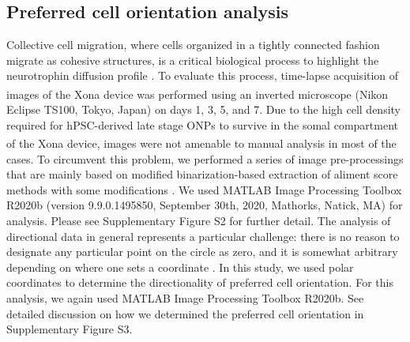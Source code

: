\documentclass[review]{elsarticle}
\begin{document}
\subsection {Preferred cell orientation analysis}
Collective cell migration, where cells organized in a tightly connected fashion migrate as cohesive structures, is a critical biological process to highlight the neurotrophin diffusion profile \cite{Mazalan2020}. To evaluate this process, time-lapse acquisition of images of the Xona\textsuperscript{\texttrademark} device was performed using an inverted microscope (Nikon Eclipse TS100, Tokyo, Japan) on days 1, 3, 5, and 7. Due to the high cell density required for hPSC-derived late stage ONPs to survive in the somal compartment of the Xona\textsuperscript{\texttrademark} device, images were not amenable to manual analysis in most of the cases. To circumvent this problem, we performed a series of image pre-processings that are mainly based on modified binarization-based extraction of aliment score methods with some modifications \cite{Xu2011}. We used MATLAB Image Processing Toolbox R2020b (version 9.9.0.1495850, September 30th, 2020, Mathorks, Natick, MA) for analysis. Please see Supplementary Figure S2 for further detail. The analysis of directional data in general represents a particular challenge: there is no reason to designate any particular point on the circle as zero, and it is somewhat arbitrary depending on where one sets a coordinate \cite{Batschelet1981,Berens2009}. In this study, we used polar coordinates to determine the directionality of preferred cell orientation.  For this analysis, we again used MATLAB Image Processing Toolbox R2020b. See detailed discussion on how we determined the preferred cell orientation in Supplementary Figure S3.
\end{document}
